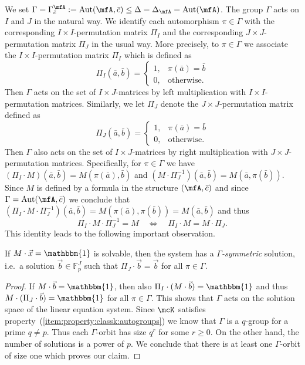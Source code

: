 \documentclass[a4paper,UKenglish]{lipics}
\newcommand{\defeq}{:=}
\newcommand{\field}[1]{\mathbb{#1}}
\newcommand{\Aut}{\ensuremath{\text{Aut}}\xspace}
\newcommand{\onevec}{\ensuremath{\mathbbm{1}}}
\newcommand{\bc}{{\bar c}}
\theoremstyle{plain}
\begin{document}
\medskip
We set $\Gamma = \Gamma_\bc^\mfA \defeq 
\Aut(\mfA,\bc) \leq \Delta = \Delta_\mfA = \Aut(\mfA)$. 
The group $\Gamma$ acts on $I$ and $J$ in the natural way. We identify 
each automorphism $\pi \in \Gamma$ with the corresponding $I\times 
I$-permutation matrix $\Pi_I$ and the corresponding $J \times J$-permutation 
matrix $\Pi_J$ in the usual way. More precisely, to $\pi \in \Gamma$ 
we associate the $I \times I$-permutation matrix $\Pi_I$ which is defined as
\[ \Pi_I(\bar a, \bar b) = \begin{cases}
                            1,&\pi(\bar a) = \bar b \\
                            0,&\text{otherwise}.
                           \end{cases}\]
Then $\Gamma$ acts on the set of $I \times J$-matrices by left
multiplication with $I \times I$-permutation matrices. Similarly, we let
$\Pi_J$ denote the $J \times J$-permutation matrix defined as 
\[ \Pi_J(\bar a, \bar b) = \begin{cases}
                            1,&\pi(\bar a) = \bar b \\
                            0,&\text{otherwise}.
                           \end{cases}\]
Then $\Gamma$ also acts on the set of $I \times J$-matrices by right
multiplication with $J \times J$-permutation matrices. Specifically, for
$\pi \in \Gamma$ we have $(\Pi_I \cdot M)(\bar a, \bar b) = M(\pi(\bar
a), \bar b)$ and $(M \cdot \Pi_J^{-1})(\bar a, \bar b) = M(\bar a, \pi(\bar
b))$. Since $M$ is defined by a formula in the structure $(\mfA, \bc)$ and 
since $\Gamma = \Aut(\mfA, \bc)$ we conclude that $(\Pi_I \cdot M \cdot 
\Pi_J^{-1})(\bar a, \bar b) = M(\pi(\bar
a), \pi(\bar b)) = M(\bar a, \bar b)$ and thus
\[ \Pi_I \cdot M \cdot \Pi_J^{-1} = M \quad\Leftrightarrow\quad \Pi_I \cdot
M = M \cdot \Pi_J. \]
This identity leads to the following important observation.

\begin{lemma}\label{lemma:fps:symmetric:solution}
 If $M \cdot \vec x = \onevec$ is solvable, then 
the system has a \emph{$\Gamma$-symmetric} solution, i.e.\ a solution $\vec 
b \in 
\field F_p^J$ such that $\Pi_J \cdot \vec b = \vec b$ for all $\pi \in 
\Gamma$.
\end{lemma}
\begin{proof}
If $M \cdot \vec b = \onevec$, then also $\Pi_I \cdot (M \cdot 
\vec b ) = \onevec$ and thus $M \cdot (\Pi_J \cdot \vec b ) = \onevec$ for all 
$\pi \in \Gamma$. This shows that $\Gamma$ acts on the solution space of the 
linear equation system. 
Since $\mcK$ satisfies property~(\ref{item:property:classk:autogroups}) we know 
that $\Gamma$ is a $q$-group for a prime $q \neq p$. Thus each $\Gamma$-orbit 
has size $q^r$ for some $r \geq 0$. On the other hand, the number of 
solutions is a power of $p$. We conclude that there is at least one 
$\Gamma$-orbit of size one which proves our claim.
\end{proof}
\end{document}
